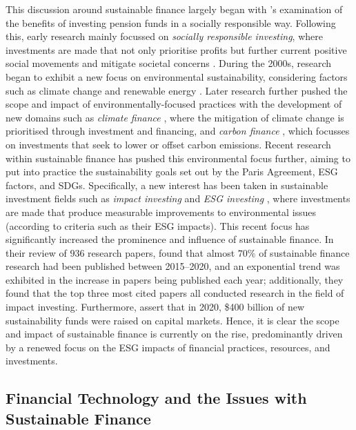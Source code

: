 \documentclass[a4paper, 11pt]{report}
\begin{document}
    This discussion around sustainable finance largely began with \citeauthor{ferris-1986}'s examination of the benefits of investing pension funds in a socially responsible way. Following this, early research mainly focussed on \emph{socially responsible investing}, where investments are made that not only prioritise profits but further current positive social movements and mitigate societal concerns \citep{cunha-2021}. During the 2000s, research began to exhibit a new focus on environmental sustainability, considering factors such as climate change and renewable energy \citep{laan-2004}. Later research further pushed the scope and impact of environmentally-focused practices with the development of new domains such as \emph{climate finance} \citep{hogarth-2012}, where the mitigation of climate change is prioritised through investment and financing, and \emph{carbon finance} \citep{aglietta-2015}, which focusses on investments that seek to lower or offset carbon emissions. Recent research within sustainable finance has pushed this environmental focus further, aiming to put into practice the sustainability goals set out by the Paris Agreement, ESG factors, and SDGs. Specifically, a new interest has been taken in sustainable investment fields such as \emph{impact investing} \citep{agrawal-2021} and \emph{ESG investing} \citep{alessandrini-2020}, where investments are made that produce measurable improvements to environmental issues (according to criteria such as their ESG impacts). This recent focus has significantly increased the prominence and influence of sustainable finance. In their review of $936$ research papers, \citet{kumar-2022} found that almost $70\%$ of sustainable finance research had been published between 2015--2020, and an exponential trend was exhibited in the increase in papers being published each year; additionally, they found that the top three most cited papers all conducted research in the field of impact investing. Furthermore, \citeauthor{kumar-2022} assert that in 2020, \$400 billion of new sustainability funds were raised on capital markets. Hence, it is clear the scope and impact of sustainable finance is currently on the rise, predominantly driven by a renewed focus on the ESG impacts of financial practices, resources, and investments.


    \subsection{Financial Technology and the Issues with Sustainable Finance}
\end{document}
